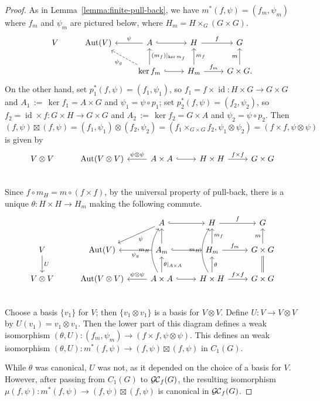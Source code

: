 \documentclass[11pt]{amsart}
\theoremstyle{plain}
\theoremstyle{definition}
\theoremstyle{remark}
\DeclareMathOperator{\Aut}{Aut}
\DeclareMathOperator{\id}{id}
\newcommand{\ceq}{{\, :=\, }}
\newcommand{\GC}{{\mathcal{G\hskip-0.8pt C}}}
\newcommand{\GCf}{{\GC_f}}
\begin{document}
\begin{proof}
As in Lemma~\ref{lemma:finite-pull-back}, we have $m^*(f,\psi) = (f_m,\psi_m)$ where $f_m$ and $\psi_m$ are pictured below, where $H_m = H\times_G(G\times G)$.
\[
\begin{tikzcd}
V & \Aut(V) & \arrow[swap]{l}{\psi} A \arrow[hook]{r} & H \arrow{r}{f} &  G\\
  &  & \arrow[dashed]{ul}{\psi_g} \arrow[swap]{u}{(m_f)\vert_{\ker m_f}} \ker f_m \arrow[hook]{r} & \arrow[swap]{u}{m_f} H_m \arrow{r}{f_m} & \arrow{u}{m} G\times G.
\end{tikzcd}
\]
On the other hand, set $p_1^*(f,\psi) = (f_1,\psi_1)$, so $f_1 = f\times \id : H\times G\to G\times G$ and $A_1\ceq \ker f_1 = A \times G$ and $\psi_1 = \psi \circ p_1$; set $p_2^*(f,\psi) = (f_2,\psi_2)$, so $f_2 = \id \times f : G\times H \to G\times G$ and $A_2\ceq \ker f_2 = G \times A$ and $\psi_2 = \psi \circ p_2$. Then $(f,\psi) \boxtimes (f,\psi) = (f_1,\psi_1) \otimes (f_2,\psi_2) = (f_1\times_{G\times G} f_2, \psi_1\otimes \psi_2) = (f\times f, \psi\otimes \psi) $ is given by
\[
\begin{tikzcd}
V\otimes V & \Aut(V\otimes V) & \arrow[swap]{l}{\psi\otimes \psi} A \times A \arrow[hook]{r}{} & H \times H \arrow{r}{f\times f} & G\times G\\
\end{tikzcd}
\]
Since $f\circ m_H = m \circ (f\times f)$, by the universal property of pull-back, there is a unique $\theta : H\times H \to H_m$ making the following commute.
\[
\begin{tikzcd}
\ &  & \arrow{ld}{\psi} A \arrow[hook]{r} & H \arrow{r}{f} &  G\\
V \arrow{d}{U} & \Aut(V)  & \arrow{l}{\psi_g} \arrow{u} A_m \arrow[hook]{r} & \arrow[swap]{u}{m_f} H_m \arrow{r}{f_m} & \arrow{u}{m} G\times G\\
V\otimes V & \Aut(V\otimes V) & \arrow[swap]{l}{\psi\otimes\psi} \arrow[bend left]{uu}{m_H} \arrow[swap]{u}{\theta\vert_{A\times A}} A \times A \arrow[hook]{r}{} & \arrow[bend left]{uu}{m_H} \arrow[swap]{u}{\theta} H \times H \arrow{r}{f\times f} & \arrow[equal]{u} G\times G\\
\end{tikzcd}
\]
Choose a basis $\{ v_1 \}$ for $V$; then $\{ v_1\otimes v_1 \}$ is a basis for $V\otimes V$. Define $U : V \to V\otimes V$ by $U(v_1) = v_1\otimes v_1$. Then the lower part of this diagram defines a weak isomorphism $(\theta,U): (f_m,\psi_m)\to (f\times f,\psi\otimes\psi)$. This defines an weak isomorphism $(\theta,U): m^*(f,\psi) \to (f,\psi)\boxtimes (f,\psi)$  in $C_1(G)$. 

While $\theta$ was canonical, $U$ was not, as it depended on the choice of a basis for $V$. However, after passing from $C_1(G)$ to $\GCf(G)$, the resulting isomorphism $\mu(f,\psi): m^*(f,\psi) \to (f,\psi)\boxtimes (f,\psi)$ is canonical in $\GCf(G)$.
\end{proof}
\end{document}
